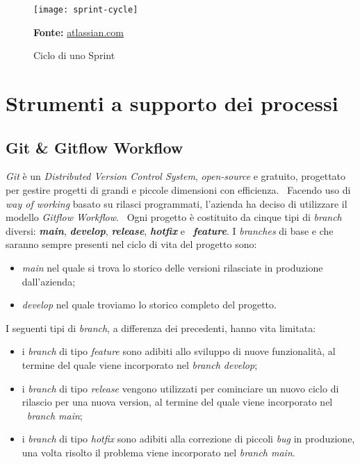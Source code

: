 \vspace{20pt}
  \begin{figure}[!ht]
    \begin{center}
      \texttt{[image: sprint-cycle]}
      \caption{Ciclo di uno Sprint}
      \textbf{Fonte:} \href{https://www.atlassian.com}{atlassian.com}
    \end{center}
  \end{figure}
\vspace{20pt} 

\section{Strumenti a supporto dei processi}

\subsection{Git \& Gitflow Workflow}
\emph{Git} è un \emph{Distributed Version Control System}, \emph{open-source} e gratuito, progettato per gestire progetti di grandi e piccole dimensioni con efficienza. \
Facendo uso di \emph{way of working} basato su rilasci programmati, l'azienda ha deciso di utilizzare il modello \emph{Gitflow Workflow}. \
Ogni progetto è costituito da cinque tipi di \emph{branch} diversi: \textbf{\emph{main}}, \textbf{\emph{develop}}, \textbf{\emph{release}}, \textbf{\emph{hotfix}} e \
\textbf{\emph{feature}}. I \emph{branches} di base e che saranno sempre presenti nel ciclo di vita del progetto sono:
\begin{itemize}
  \item \emph{main} nel quale si trova lo storico delle versioni rilasciate in produzione dall'azienda;
  \item \emph{develop} nel quale troviamo lo storico completo del progetto. 
\end{itemize}  

I seguenti tipi di \emph{branch}, a differenza dei precedenti, hanno vita limitata: \
\begin{itemize}
  \item i \emph{branch} di tipo \emph{feature} sono adibiti allo sviluppo di nuove funzionalità, al termine del quale viene incorporato nel \emph{branch develop}; 
  \item i \emph{branch} di tipo \emph{release} vengono utilizzati per cominciare un nuovo ciclo di rilascio per una nuova version, al termine del quale viene incorporato nel \
  \emph{branch main}; 
  \item i \emph{branch} di tipo \emph{hotfix} sono adibiti alla correzione di piccoli \emph{bug} in produzione, una volta risolto il problema viene incorporato nel \emph{branch main}.
\end{itemize}

